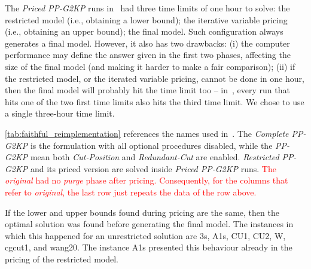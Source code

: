 \documentclass[smallextended]{svjour3}       %
\newif\iffinalversion
\newcommand{\oldtext}[1]{\iffinalversion%
\else%
\textcolor{red}{#1}%
\fi%
}
\begin{document}
The \emph{Priced PP-G2KP} runs in~\cite{furini:2016,dimitri_thesis} had three time limits of one hour to solve: the restricted model (i.e., obtaining a lower bound); the iterative variable pricing (i.e., obtaining an upper bound); the final model.
Such configuration always generates a final model.
However, it also has two drawbacks:
(i) the computer performance may define the answer given in the first two phases, affecting the size of the final model (and making it harder to make a fair comparison);
(ii) if the restricted model, or the iterated variable pricing, cannot be done in one hour, then the final model will probably hit the time limit too -- in~\cite{furini:2016}, every run that hits one of the two first time limits also hits the third time limit.
We chose to use a single three-hour time limit.

\autoref{tab:faithful_reimplementation} references the names used in~\cite{furini:2016,dimitri_thesis}.
The \emph{Complete PP-G2KP} is the formulation with all optional procedures disabled, while the \emph{PP-G2KP} mean both \emph{Cut-Position} and \emph{Redundant-Cut} are enabled.
\emph{Restricted PP-G2KP} and its priced version are solved inside \emph{Priced PP-G2KP} runs. \oldtext{The \emph{original} had no \emph{purge} phase after pricing. Consequently, for the columns that refer to \emph{original}, the last row just repeats the data of the row above.}
If the lower and upper bounds found during pricing are the same, then the optimal solution was found before generating the final model.
The instances in which this happened for an unrestricted solution are 3s, A1s, CU1, CU2, W, cgcut1, and wang20.
The instance A1s presented this behaviour already in the pricing of the restricted model.
\end{document}
